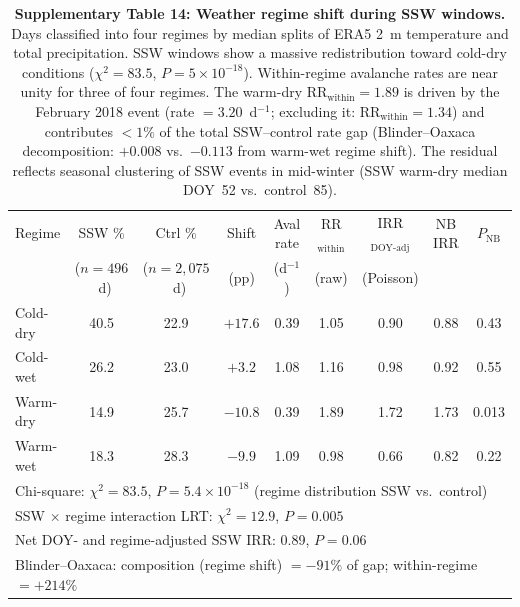 \documentclass[11pt,letterpaper]{article}
\begin{document}
\begin{table}[!ht]
\centering
\caption{\textbf{Supplementary Table 14: Weather regime shift during SSW windows.}
Days classified into four regimes by median splits of ERA5 2~m temperature and total precipitation. SSW windows show a massive redistribution toward cold-dry conditions ($\chi^2 = 83.5$, $P = 5 \times 10^{-18}$). Within-regime avalanche rates are near unity for three of four regimes. The warm-dry $\mathrm{RR}_{\mathrm{within}} = 1.89$ is driven by the February 2018 event (rate $= 3.20$~d$^{-1}$; excluding it: $\mathrm{RR}_{\mathrm{within}} = 1.34$) and contributes $< 1\%$ of the total SSW--control rate gap (Blinder--Oaxaca decomposition: $+0.008$ vs.\ $-0.113$ from warm-wet regime shift). The residual reflects seasonal clustering of SSW events in mid-winter (SSW warm-dry median DOY~52 vs.\ control~85).}
\label{tab:regime}
\small
\begin{tabular}{lcccccccc}
\toprule
Regime & SSW \% & Ctrl \% & Shift & Aval rate & RR$_{\mathrm{within}}$ & IRR$_{\mathrm{DOY\text{-}adj}}$ & NB IRR & $P_{\mathrm{NB}}$ \\
 & ($n = 496$~d) & ($n = 2{,}075$~d) & (pp) & (d$^{-1}$) & (raw) & (Poisson) & & \\
\midrule
Cold-dry & 40.5 & 22.9 & $+17.6$ & 0.39 & 1.05 & 0.90 & 0.88 & 0.43 \\
Cold-wet & 26.2 & 23.0 & $+3.2$ & 1.08 & 1.16 & 0.98 & 0.92 & 0.55 \\
Warm-dry & 14.9 & 25.7 & $-10.8$ & 0.39 & 1.89 & 1.72 & 1.73 & 0.013 \\
Warm-wet & 18.3 & 28.3 & $-9.9$ & 1.09 & 0.98 & 0.66 & 0.82 & 0.22 \\
\midrule
\multicolumn{9}{l}{Chi-square: $\chi^2 = 83.5$, $P = 5.4 \times 10^{-18}$ (regime distribution SSW vs.\ control)} \\
\multicolumn{9}{l}{SSW $\times$ regime interaction LRT: $\chi^2 = 12.9$, $P = 0.005$} \\
\multicolumn{9}{l}{Net DOY- and regime-adjusted SSW IRR: 0.89, $P = 0.06$} \\
\multicolumn{9}{l}{Blinder--Oaxaca: composition (regime shift) $= -91\%$ of gap; within-regime $= +214\%$} \\
\bottomrule
\end{tabular}
\end{table}

\end{document}
